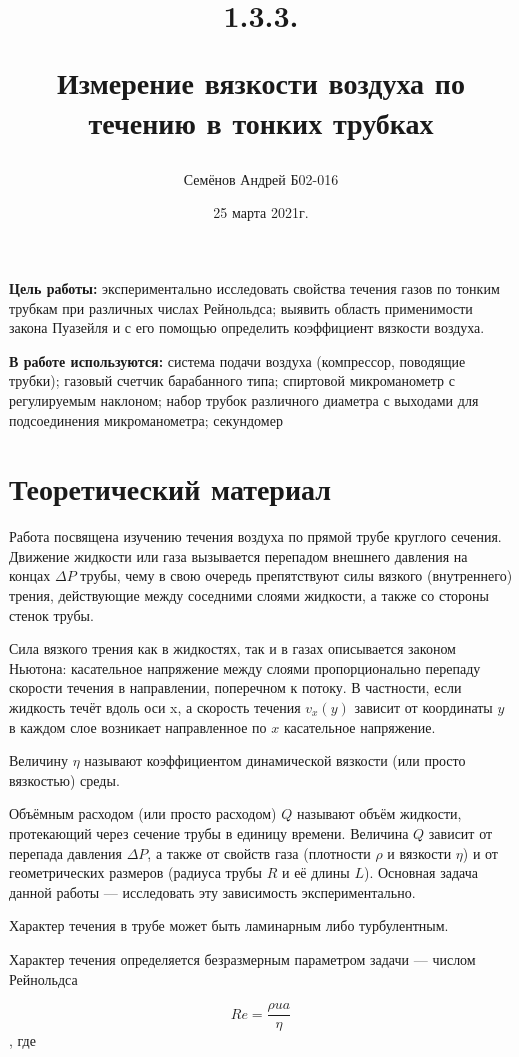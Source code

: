 \documentclass[12pt,a4paper]{article}
\title{
1.3.3.

Измерение вязкости воздуха по течению
в тонких трубках
}
\author{Семёнов Андрей Б02-016}
\begin{document}
\date{25 марта 2021г.}
\maketitle
\newpage

\textbf{Цель работы:} экспериментально исследовать свойства течения газов по тонким трубкам при различных числах Рейнольдса; выявить область применимости закона Пуазейля и с его помощью определить коэффициент вязкости воздуха.

\textbf{В работе используются:} система подачи воздуха (компрессор, поводящие трубки); газовый счетчик барабанного типа; спиртовой микроманометр с регулируемым наклоном; набор трубок различного диаметра с выходами для подсоединения микроманометра; секундомер

\section{Теоретический материал}

Работа посвящена изучению течения воздуха по прямой трубе круглого сечения. Движение жидкости или газа вызывается перепадом внешнего давления на концах $\Delta P$ трубы, чему в свою очередь препятствуют силы вязкого (внутреннего) трения, действующие между соседними слоями жидкости, а также со стороны стенок трубы.

Сила вязкого трения как в жидкостях, так и в газах описывается законом
Ньютона: касательное напряжение между слоями пропорционально перепаду
скорости течения в направлении, поперечном к потоку. В частности, если жидкость течёт вдоль оси x,  а скорость течения $v_{x}(y)$ зависит от координаты $y$  в каждом слое возникает направленное по $x$ касательное напряжение.

Величину $\eta$ называют коэффициентом динамической вязкости (или просто вязкостью) среды.

Объёмным расходом (или просто расходом) $Q$ называют объём жидкости,
протекающий через сечение трубы в единицу времени. Величина $Q$ зависит от
перепада давления $\Delta P$, а также от свойств газа (плотности $\rho$ и вязкости $\eta$) и от
геометрических размеров (радиуса трубы $R$ и её длины $L$). Основная задача
данной работы — исследовать эту зависимость экспериментально.

Характер течения в трубе может быть ламинарным либо турбулентным. 

Характер течения определяется безразмерным параметром задачи — числом Рейнольдса

$$ Re = \frac{\rho u a}{\eta}$$, где
\end{document}
